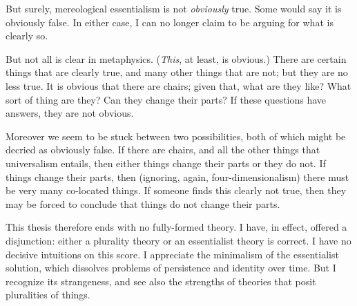 \documentclass[11pt]{article}
\begin{document}
\begin{spacing}{1.5}
But surely, mereological essentialism is not {\em obviously} true.
Some would say it is obviously false.  In either case, I can no longer
claim to be arguing for what is clearly so.

But not all is clear in metaphysics.  ({\em This}, at least, is
obvious.)  There are certain things that are clearly true, and many
other things that are not; but they are no less true.  It is obvious
that there are chairs; given that, what are they like?  What sort of
thing are they?  Can they change their parts?  If these questions have
answers, they are not obvious.

Moreover we seem to be stuck between two possibilities, both of which
might be decried as obviously false.  If there are chairs, and all the
other things that universalism entails, then either things change
their parts or they do not.  If things change their parts, then
(ignoring, again, four-dimensionalism) there must be very many
co-located things.  If someone finds this clearly not true, then they
may be forced to conclude that things do not change their parts.

This thesis therefore ends with no fully-formed theory.  I have, in
effect, offered a disjunction: either a plurality theory or an
essentialist theory is correct. I have no decisive intuitions on this
score.  I appreciate the minimalism of the essentialist solution,
which dissolves problems of persistence and identity over time.  But I
recognize its strangeness, and see also the strengths of theories that
posit pluralities of things.

\ifstandalone
\end{spacing}


\fi
\end{document}
